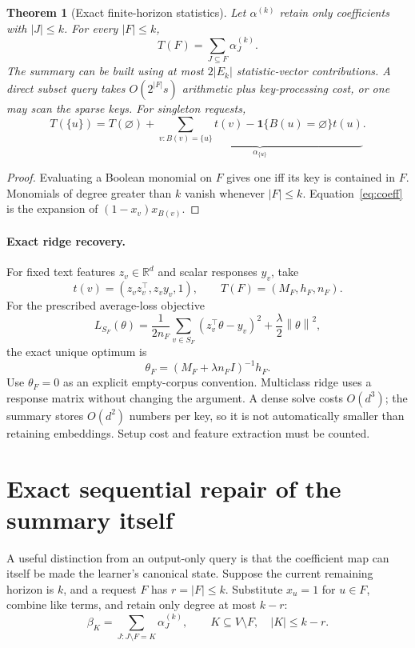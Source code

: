 \documentclass[11pt,a4paper]{article}
\newtheorem{theorem}{Theorem}[section]
\theoremstyle{definition}\newtheorem{definition}[theorem]{Definition}
\newcommand{\R}{\mathbb R}\newcommand{\E}{\mathbb E}\newcommand{\1}{\mathbf 1}
\newcommand{\norm}[1]{\left\lVert #1\right\rVert}
\newcommand{\minus}{\setminus}
\begin{document}
\begin{theorem}[Exact finite-horizon statistics]\label{thm:poly}
Let $\alpha^{(k)}$ retain only coefficients with $|J|\le k$. For every $|F|\le k$,
\begin{equation}\label{eq:query}
 T(F)=\sum_{J\subseteq F}\alpha^{(k)}_J.
\end{equation}
The summary can be built using at most $2|E_k|$ statistic-vector contributions. A direct subset query takes $O(2^{|F|}s)$ arithmetic plus key-processing cost, or one may scan the sparse keys. For singleton requests,
\[
 T(\{u\})=T(\varnothing)+
 \underbrace{\sum_{v:B(v)=\{u\}}t(v)-\1\{B(u)=\varnothing\}t(u)}_{\alpha_{\{u\}}}.
\]
\end{theorem}
\begin{proof}
Evaluating a Boolean monomial on $F$ gives one iff its key is contained in $F$. Monomials of degree greater than $k$ vanish whenever $|F|\le k$. Equation~\eqref{eq:coeff} is the expansion of $(1-x_v)x_{B(v)}$.
\end{proof}

\paragraph{Exact ridge recovery.} For fixed text features $z_v\in\R^d$ and scalar responses $y_v$, take
\[
 t(v)=(z_vz_v^\top,z_vy_v,1),\qquad T(F)=(M_F,h_F,n_F).
\]
For the prescribed average-loss objective
\[
 L_{S_F}(\theta)=\frac1{2n_F}\sum_{v\in S_F}(z_v^\top\theta-y_v)^2+
                 \frac\lambda2\norm{\theta}^2,
\]
the exact unique optimum is
\begin{equation}\label{eq:ridge}
 \theta_F=(M_F+\lambda n_F I)^{-1}h_F.
\end{equation}
Use $\theta_F=0$ as an explicit empty-corpus convention. Multiclass ridge uses a response matrix without changing the argument. A dense solve costs $O(d^3)$; the summary stores $O(d^2)$ numbers per key, so it is not automatically smaller than retaining embeddings. Setup cost and feature extraction must be counted.

\section{Exact sequential repair of the summary itself}\label{sec:canonical}
A useful distinction from an output-only query is that the coefficient map can itself be made the learner's canonical state. Suppose the current remaining horizon is $k$, and a request $F$ has $r=|F|\le k$. Substitute $x_u=1$ for $u\in F$, combine like terms, and retain only degree at most $k-r$:
\begin{equation}\label{eq:state}
 \beta_K=\sum_{J:J\minus F=K}\alpha_J^{(k)},
 \qquad K\subseteq V\minus F,\quad |K|\le k-r.
\end{equation}
\end{document}
